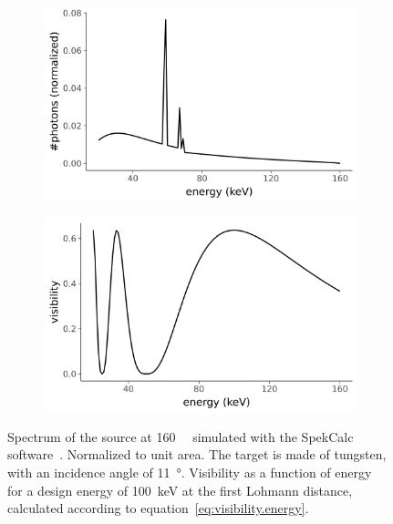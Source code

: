 \begin{figure}[htb]
    \centering
    \begin{subfigure}[b]{.75\textwidth}
    \centering
    \includegraphics[width=\textwidth]{gfx/spectrum-visibility/spectrum.png}
    \caption{}
    \label{fig:spectrum}
    \end{subfigure}
    \hfill
    \begin{subfigure}[b]{.75\textwidth}
    \centering
    \includegraphics[width=\textwidth]{gfx/spectrum-visibility/visibility.png}
    \caption{}
    \label{fig:visibility}
    \end{subfigure}
    \caption[Spectrum and theoretical visibility of the \SI{100}{\kilo\eV}
    interferometer.]{Spectrum of the source at \SI{160}{\kilo\voltpeak}
simulated with the SpekCalc software~\parencite{spekcalc}. Normalized to
unit area. The target is made of tungsten, with an incidence angle of
\SI{11}{\degree}. Visibility as a
function of energy~\parencite{Thuering20130027} for a design energy of \SI{100}{\kilo\eV} at the first
Lohmann distance, calculated according to
equation~\ref{eq:visibility.energy}.}
    \label{fig:visibility.energy}
\end{figure}

